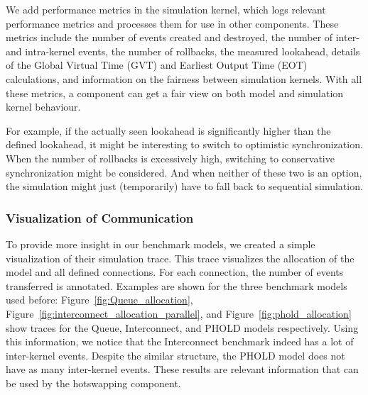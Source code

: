 We add performance metrics in the simulation kernel, which logs relevant performance metrics and processes them for use in other components.
These metrics include the number of events created and destroyed, the number of inter- and intra-kernel events, the number of rollbacks, the measured lookahead, details of the Global Virtual Time (GVT) and Earliest Output Time (EOT) calculations, and information on the fairness between simulation kernels.
With all these metrics, a component can get a fair view on both model and simulation kernel behaviour.

For example, if the actually seen lookahead is significantly higher than the defined lookahead, it might be interesting to switch to optimistic synchronization.
When the number of rollbacks is excessively high, switching to conservative synchronization might be considered.
And when neither of these two is an option, the simulation might just (temporarily) have to fall back to sequential simulation.

\subsubsection{Visualization of Communication}
To provide more insight in our benchmark models, we created a simple visualization of their simulation trace.
This trace visualizes the allocation of the model and all defined connections.
For each connection, the number of events transferred is annotated.
Examples are shown for the three benchmark models used before: Figure~\ref{fig:Queue_allocation}, Figure~\ref{fig:interconnect_allocation_parallel}, and Figure~\ref{fig:phold_allocation} show traces for the Queue, Interconnect, and PHOLD models respectively.
Using this information, we notice that the Interconnect benchmark indeed has a lot of inter-kernel events.
Despite the similar structure, the PHOLD model does not have as many inter-kernel events.
These results are relevant information that can be used by the hotswapping component.

